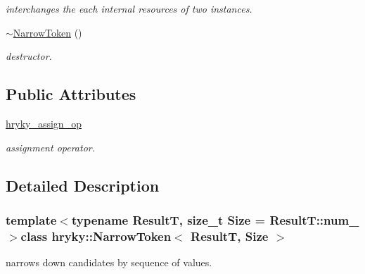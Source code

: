 \begin{DoxyCompactItemize}
\begin{DoxyCompactList}\small\item\em interchanges the each internal resources of two instances. \end{DoxyCompactList}\item 
\hypertarget{classhryky_1_1_narrow_token_a52b08c0ec3f338bea935f6659b456b09}{\hyperlink{classhryky_1_1_narrow_token_a52b08c0ec3f338bea935f6659b456b09}{$\sim$\-Narrow\-Token} ()}\label{classhryky_1_1_narrow_token_a52b08c0ec3f338bea935f6659b456b09}

\begin{DoxyCompactList}\small\item\em destructor. \end{DoxyCompactList}\end{DoxyCompactItemize}
\subsection*{Public Attributes}
\begin{DoxyCompactItemize}
\item 
\hypertarget{classhryky_1_1_narrow_token_ae7559074062ed5f2d6249c6730545552}{\hyperlink{classhryky_1_1_narrow_token_ae7559074062ed5f2d6249c6730545552}{hryky\-\_\-assign\-\_\-op}}\label{classhryky_1_1_narrow_token_ae7559074062ed5f2d6249c6730545552}

\begin{DoxyCompactList}\small\item\em assignment operator. \end{DoxyCompactList}\end{DoxyCompactItemize}


\subsection{Detailed Description}
\subsubsection*{template$<$typename Result\-T, size\-\_\-t Size = Result\-T\-::num\-\_\-$>$class hryky\-::\-Narrow\-Token$<$ Result\-T, Size $>$}

narrows down candidates by sequence of values. 

